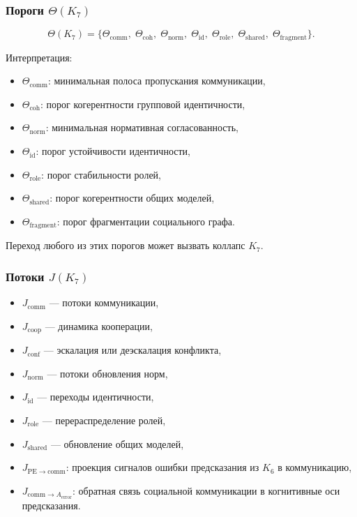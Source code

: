 \subsubsection{Пороги \texorpdfstring{$\Theta(K_7)$}{\Theta(K_7)}}

\[
\Theta(K_7)=
\{
\Theta_{\mathrm{comm}},\;
\Theta_{\mathrm{coh}},\;
\Theta_{\mathrm{norm}},\;
\Theta_{\mathrm{id}},\;
\Theta_{\mathrm{role}},\;
\Theta_{\mathrm{shared}},\;
\Theta_{\mathrm{fragment}}
\}.
\]

Интерпретация:
\begin{itemize}
    \item $\Theta_{\mathrm{comm}}$: минимальная полоса пропускания коммуникации,
    \item $\Theta_{\mathrm{coh}}$: порог когерентности групповой идентичности,
    \item $\Theta_{\mathrm{norm}}$: минимальная нормативная согласованность,
    \item $\Theta_{\mathrm{id}}$: порог устойчивости идентичности,
    \item $\Theta_{\mathrm{role}}$: порог стабильности ролей,
    \item $\Theta_{\mathrm{shared}}$: порог когерентности общих моделей,
    \item $\Theta_{\mathrm{fragment}}$: порог фрагментации социального графа.
\end{itemize}

Переход любого из этих порогов может вызвать коллапс $K_7$.

\subsubsection{Потоки \texorpdfstring{$J(K_7)$}{J(K_7)}}

\begin{itemize}
    \item $J_{\mathrm{comm}}$ — потоки коммуникации,
    \item $J_{\mathrm{coop}}$ — динамика кооперации,
    \item $J_{\mathrm{conf}}$ — эскалация или деэскалация конфликта,
    \item $J_{\mathrm{norm}}$ — потоки обновления норм,
    \item $J_{\mathrm{id}}$ — переходы идентичности,
    \item $J_{\mathrm{role}}$ — перераспределение ролей,
    \item $J_{\mathrm{shared}}$ — обновление общих моделей,
    \item $J_{\mathrm{PE}\to\mathrm{comm}}$: проекция сигналов ошибки
      предсказания из $K_6$ в коммуникацию,
    \item $J_{\mathrm{comm}\to A_{\mathrm{error}}}$: обратная связь социальной
      коммуникации в когнитивные оси предсказания.
\end{itemize}

